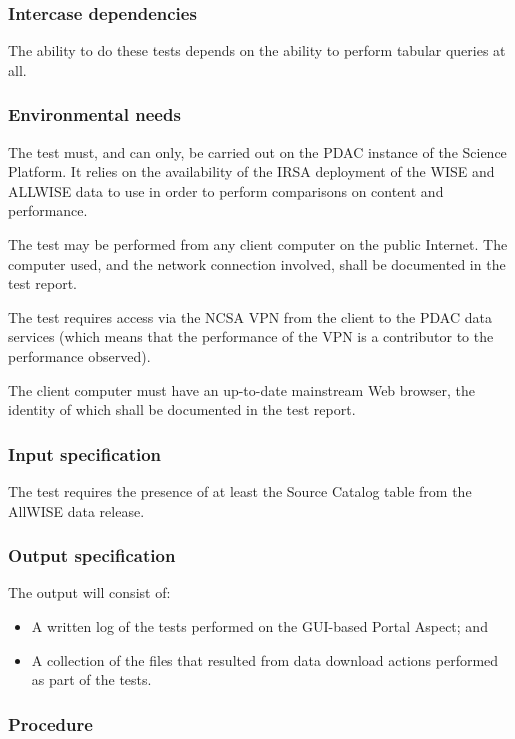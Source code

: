 \subsubsection{Intercase dependencies}

The ability to do these tests depends on the ability to perform tabular queries at all.

\subsubsection{Environmental needs}

The test must, and can only, be carried out on the PDAC instance of the Science Platform.
It relies on the availability of the IRSA deployment of the WISE and ALLWISE data to use in order to perform comparisons on content and performance.

The test may be performed from any client computer on the public Internet.
The computer used, and the network connection involved, shall be documented in the test report.

The test requires access via the NCSA VPN from the client to the PDAC data services 
(which means that the performance of the VPN is a contributor to the performance observed).

The client computer must have an up-to-date mainstream Web browser, the identity of which shall be documented in the test report.


\subsubsection{Input specification}

The test requires the presence of at least the Source Catalog table from the AllWISE data release.


\subsubsection{Output specification}

The output will consist of:

\begin{itemize}
  \item{A written log of the tests performed on the GUI-based Portal Aspect; and}
  \item{A collection of the files that resulted from data download actions performed as part of the tests.}
\end{itemize}


\subsubsection{Procedure}

